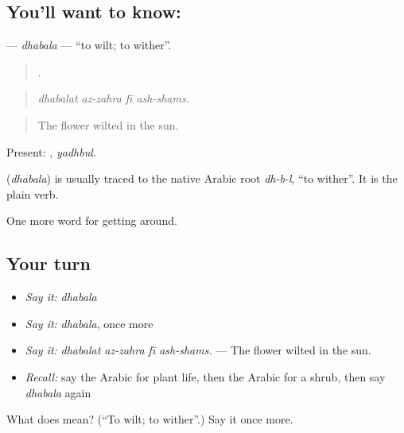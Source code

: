 \subsection*{You'll want to know: }
\textbf{} — \emph{dhabala} — \textquotedblleft{}to wilt; to wither\textquotedblright{}.

\begin{quote}
   .
\end{quote}

\begin{quote}
\emph{dhabalat az-zahra fī ash-shams.}
\end{quote}

\begin{quote}
The flower wilted in the sun.
\end{quote}

Present: , \emph{yadhbul}.

\begin{cousinweb}
\textbf{} (\emph{dhabala}) is usually traced to the native Arabic root \emph{dh-b-l}, \textquotedblleft{}to wither\textquotedblright{}. It is the plain verb.
\end{cousinweb}

\begin{grammarlens}[title={What you've built}]
One more word for getting around.
\end{grammarlens}

\subsection*{Your turn}
\begin{itemize}
\raggedright
  \item \emph{Say it:} \emph{dhabala}
  \item \emph{Say it:} \emph{dhabala}, once more
  \item \emph{Say it:} \emph{dhabalat az-zahra fī ash-shams.} — The flower wilted in the sun.
  \item \emph{Recall:} say the Arabic for plant life, then the Arabic for a shrub, then say \emph{dhabala} again
\end{itemize}

\begin{tcolorbox}[breakable,colback=teal!4,colframe=teal!35!black,title={Before you move on}]
What does  mean? (\textquotedblleft{}To wilt; to wither\textquotedblright{}.) Say it once more.
\end{tcolorbox}
